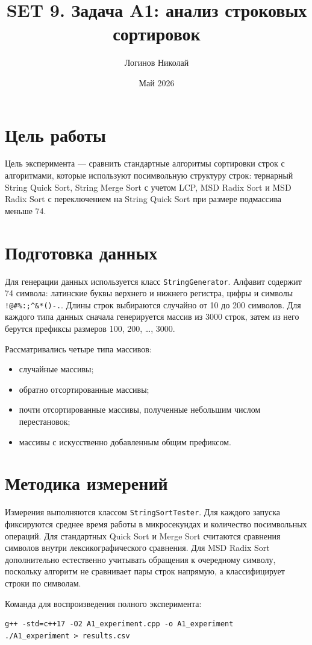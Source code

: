 \documentclass[12pt,a4paper]{article}
\title{SET 9. Задача A1: анализ строковых сортировок}
\author{Логинов Николай}
\date{Май 2026}
\begin{document}
\maketitle

\section*{Цель работы}
Цель эксперимента --- сравнить стандартные алгоритмы сортировки строк с алгоритмами,
которые используют посимвольную структуру строк: тернарный String Quick Sort,
String Merge Sort с учетом LCP, MSD Radix Sort и MSD Radix Sort с переключением на
String Quick Sort при размере подмассива меньше 74.

\section*{Подготовка данных}
Для генерации данных используется класс \texttt{StringGenerator}. Алфавит содержит
74 символа: латинские буквы верхнего и нижнего регистра, цифры и символы
\texttt{!@\#\%:;\^{}\&*()-.}. Длины строк выбираются случайно от 10 до 200 символов.
Для каждого типа данных сначала генерируется массив из 3000 строк, затем из него
берутся префиксы размеров 100, 200, \ldots, 3000.

Рассматривались четыре типа массивов:
\begin{itemize}
  \item случайные массивы;
  \item обратно отсортированные массивы;
  \item почти отсортированные массивы, полученные небольшим числом перестановок;
  \item массивы с искусственно добавленным общим префиксом.
\end{itemize}

\section*{Методика измерений}
Измерения выполняются классом \texttt{StringSortTester}. Для каждого запуска фиксируются
среднее время работы в микросекундах и количество посимвольных операций. Для стандартных
Quick Sort и Merge Sort считаются сравнения символов внутри лексикографического сравнения.
Для MSD Radix Sort дополнительно естественно учитывать обращения к очередному символу,
поскольку алгоритм не сравнивает пары строк напрямую, а классифицирует строки по символам.

Команда для воспроизведения полного эксперимента:
\begin{verbatim}
g++ -std=c++17 -O2 A1_experiment.cpp -o A1_experiment
./A1_experiment > results.csv
\end{verbatim}
\end{document}
